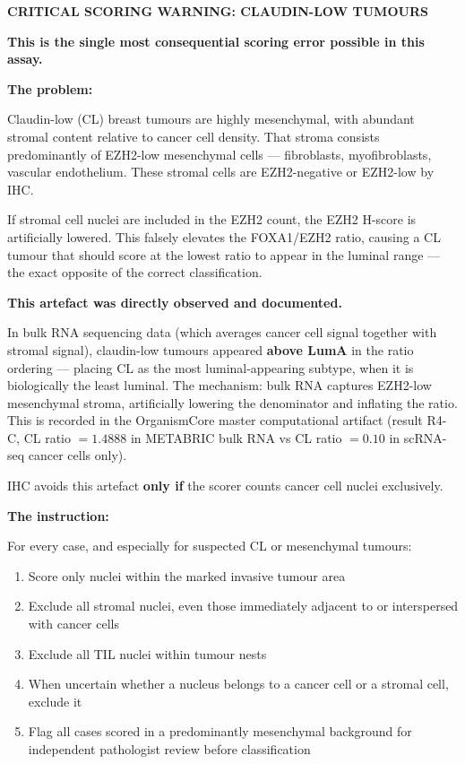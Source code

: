 \documentclass[11pt, a4paper]{article}
\begin{document}
\begin{mdframed}[backgroundcolor=criticalbox,
                 linecolor=red!70!black,
                 linewidth=2pt]
\textbf{\large CRITICAL SCORING WARNING:
CLAUDIN-LOW TUMOURS}

\bigskip
\textbf{This is the single most consequential
scoring error possible in this assay.}

\bigskip
\textbf{The problem:}

Claudin-low (CL) breast tumours are highly
mesenchymal, with abundant stromal content
relative to cancer cell density. That stroma
consists predominantly of EZH2-low mesenchymal
cells --- fibroblasts, myofibroblasts, vascular
endothelium. These stromal cells are EZH2-negative
or EZH2-low by IHC.

If stromal cell nuclei are included in the
EZH2 count, the EZH2 H-score is artificially
lowered. This falsely elevates the FOXA1/EZH2
ratio, causing a CL tumour that should score
at the lowest ratio to appear in the
luminal range --- the exact opposite of the
correct classification.

\bigskip
\textbf{This artefact was directly observed
and documented.}

In bulk RNA sequencing data (which averages
cancer cell signal together with stromal
signal), claudin-low tumours appeared
\textbf{above LumA} in the ratio ordering
--- placing CL as the most luminal-appearing
subtype, when it is biologically the least
luminal. The mechanism: bulk RNA captures
EZH2-low mesenchymal stroma, artificially
lowering the denominator and inflating the
ratio. This is recorded in the OrganismCore
master computational artifact (result R4-C,
CL ratio $= 1.4888$ in METABRIC bulk RNA
vs CL ratio $= 0.10$ in scRNA-seq cancer
cells only).

IHC avoids this artefact \textbf{only if}
the scorer counts cancer cell nuclei
exclusively.

\bigskip
\textbf{The instruction:}

For every case, and especially for suspected
CL or mesenchymal tumours:
\begin{enumerate}
    \item Score only nuclei within the
    marked invasive tumour area
    \item Exclude all stromal nuclei, even
    those immediately adjacent to or
    interspersed with cancer cells
    \item Exclude all TIL nuclei within
    tumour nests
    \item When uncertain whether a nucleus
    belongs to a cancer cell or a stromal
    cell, exclude it
    \item Flag all cases scored in a
    predominantly mesenchymal background
    for independent pathologist review
    before classification
\end{enumerate}


\end{mdframed}
\end{document}
